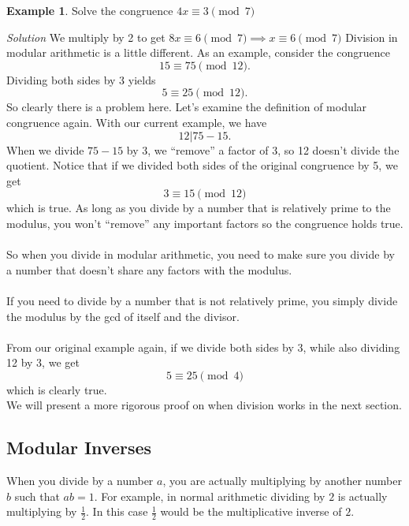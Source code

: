 \documentclass[letterpaper]{article}
\theoremstyle{plain}
\theoremstyle{definition}
\newtheorem{example}[thm]{Example}
\theoremstyle{remark}
\begin{document}
\begin{mdframed}
    \begin{example} 
        Solve the congruence $4x \equiv 3 \pmod{7} $
    \end{example}
\end{mdframed}
\emph{Solution} We multiply by 2 to get $8x \equiv 6 \pmod{7} \implies \boxed{x \equiv 6 \pmod{7}}$
\newpage
Division in modular arithmetic is a little different. As an example, consider the congruence
$$15 \equiv 75 \pmod{12}.$$
Dividing both sides by 3 yields $$5 \equiv 25 \pmod{12}.$$
So clearly there is a problem here.
Let's examine the definition of modular congruence again.
With our current example, we have 
$$12 | 75-15.$$
When we divide $75-15$ by 3, we ``remove'' a factor of 3, so 12 doesn't divide the quotient.
Notice that if we divided both sides of the original congruence by 5, we get 
$$3 \equiv 15 \pmod{12}$$ which is true. As long as you divide by a number that is relatively prime to the modulus,
you won't ``remove'' any important factors so the congruence holds true.\\\\
So when you divide in modular arithmetic, you need to make sure you divide by a number that doesn't share any factors with the modulus.
\\\\
If you need to divide by a number that is not relatively prime, you simply divide the modulus by the gcd of itself and the divisor. 
\\\\
From our original example again, if we divide both sides by 3, while also dividing 12 by 3, we get 
$$5 \equiv 25 \pmod{4}$$ which is clearly true. \\

We will present a more rigorous proof on when division works in the next section.

\subsection*{Modular Inverses}
When you divide by a number $a$, you are actually multiplying by another number $b$ such that $ab=1$.
For example, in normal arithmetic dividing by $2$ is actually multiplying by $\frac{1}{2}$. 
In this case $\frac{1}{2}$ would be the multiplicative inverse of $2$.
\\
\end{document}
